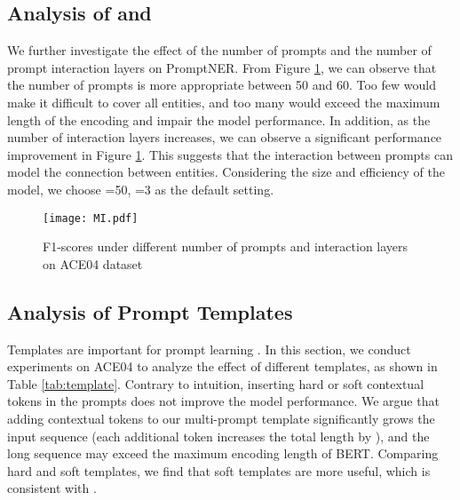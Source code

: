 \documentclass[11pt]{article}
\begin{document}
\subsection{Analysis of  and }


We further investigate the effect of the number of prompts and the number of prompt interaction layers on PromptNER.
From Figure \ref{fig:mi}, we can observe that the number of prompts is more appropriate between 50 and 60. Too few would make it difficult to cover all entities, and too many would exceed the maximum length of the encoding and impair the model performance.
In addition, as the number of interaction layers increases, we can observe a significant performance improvement in Figure \ref{fig:mi}.
This suggests that the interaction between prompts can model the connection between entities.
Considering the size and efficiency of the model, we choose =50, =3 as the default setting.

\begin{figure}[!h]
    \centering
    \texttt{[image: MI.pdf]}
    \caption{F1-scores under different number of prompts  and interaction layers  on ACE04 dataset}
    \label{fig:mi}
\end{figure}

\subsection{Analysis of Prompt Templates}
\label{template}
Templates are important for prompt learning \citep{gao-etal-2021-making, ding-etal-2021-nerd}. In this section, we conduct experiments on ACE04 to analyze the effect of different templates, as shown in Table \ref{tab:template}. Contrary to intuition, inserting hard or soft contextual tokens in the prompts does not improve the model performance. We argue that adding contextual tokens to our multi-prompt template significantly grows the input sequence (each additional token increases the total length by ), and the long sequence may exceed the maximum encoding length of BERT. Comparing hard and soft templates, we find that soft templates are more useful, which is consistent with \citet{ding-etal-2021-nerd}.
\end{document}
